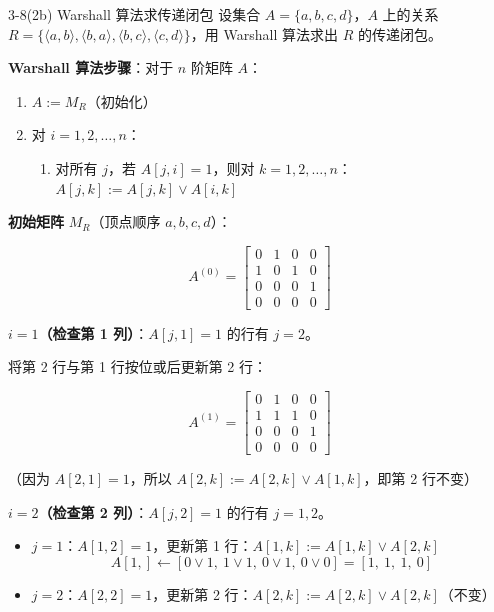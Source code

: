 \documentclass[11pt]{article}
\begin{document}
\begin{question}{3-8(2b) Warshall 算法求传递闭包}
  设集合 $A = \{a, b, c, d\}$，$A$ 上的关系 $R = \{\langle a,b\rangle, \langle b,a\rangle, \langle b,c\rangle, \langle c,d\rangle\}$，用 Warshall 算法求出 $R$ 的传递闭包。

  \begin{answer}
    \textbf{Warshall 算法步骤}：对于 $n$ 阶矩阵 $A$：

    \begin{enumerate}
      \item $A := M_R$（初始化）
      \item 对 $i = 1, 2, \dots, n$：
      \begin{enumerate}
        \item 对所有 $j$，若 $A[j,i] = 1$，则对 $k = 1, 2, \dots, n$：$A[j,k] := A[j,k] \lor A[i,k]$
      \end{enumerate}
    \end{enumerate}

    \vspace{0.5em}
    \textbf{初始矩阵} $M_R$（顶点顺序 $a,b,c,d$）：

    $$A^{(0)} = \begin{bmatrix} 0 & 1 & 0 & 0 \\ 1 & 0 & 1 & 0 \\ 0 & 0 & 0 & 1 \\ 0 & 0 & 0 & 0 \end{bmatrix}$$

    \vspace{0.5em}
    \textbf{$i = 1$（检查第 1 列）}：$A[j,1] = 1$ 的行有 $j=2$。

    将第 2 行与第 1 行按位或后更新第 2 行：

    $$A^{(1)} = \begin{bmatrix} 0 & 1 & 0 & 0 \\ 1 & 1 & 1 & 0 \\ 0 & 0 & 0 & 1 \\ 0 & 0 & 0 & 0 \end{bmatrix}$$

    （因为 $A[2,1]=1$，所以 $A[2,k] := A[2,k] \lor A[1,k]$，即第 2 行不变）

    \vspace{0.5em}
    \textbf{$i = 2$（检查第 2 列）}：$A[j,2] = 1$ 的行有 $j=1, 2$。

    \begin{itemize}
      \item $j=1$：$A[1,2]=1$，更新第 1 行：$A[1,k] := A[1,k] \lor A[2,k]$
        $$A[1,] \leftarrow [0\lor 1,\ 1\lor 1,\ 0\lor 1,\ 0\lor 0] = [1,\ 1,\ 1,\ 0]$$
      \item $j=2$：$A[2,2]=1$，更新第 2 行：$A[2,k] := A[2,k] \lor A[2,k]$（不变）
    \end{itemize}


\end{answer}
\end{question}
\end{document}
